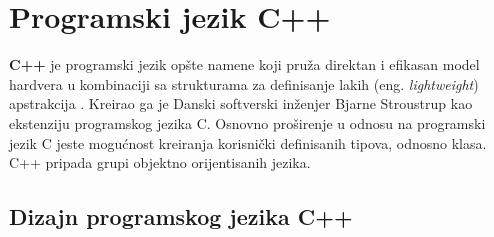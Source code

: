 \documentclass[12pt,oneside]{memoir}
\begin{document}








\chapter{Programski jezik C++}
\label{chp:autosar}

\textbf{C++} je programski jezik op\v{s}te namene koji pru\v{z}a direktan i efikasan model hardvera u kombinaciji sa strukturama za definisanje lakih (eng. \textit{lightweight}) apstrakcija \cite{TheC++ProgrammingLanguage}. Kreirao ga je Danski softverski in\v{z}enjer Bjarne Stroustrup kao ekstenziju programskog jezika C. Osnovno pro\v{s}irenje u odnosu na programski jezik C jeste mogu\'{c}nost kreiranja korisni\v{c}ki definisanih tipova, odnosno klasa. C++ pripada grupi objektno orijentisanih jezika. 

\section{Dizajn programskog jezika C++}
\end{document}
